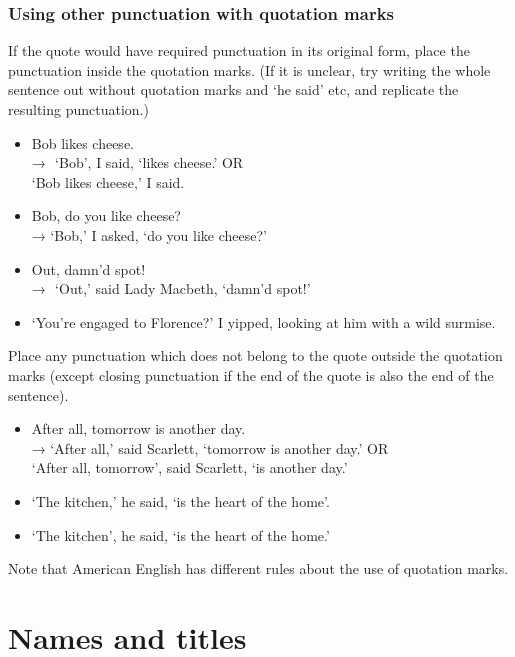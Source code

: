 \documentclass[11pt,a4paper]{book}
\newcommand{\xmark}{{\color{cadmiumred}\ding{54}}}%
\newcommand{\cmark}{{\color{green(html/cssgreen)}\checkmark}}%
\begin{document}
	\subsection{Using other punctuation with quotation marks}
	If the quote would have required punctuation in its original form, place the punctuation inside the quotation marks. (If it is unclear, try writing the whole sentence out without quotation marks and `he said' etc, and replicate the resulting punctuation.)
		{\firasans \begin{mdframed}[backgroundcolor=aliceblue] \begin{itemize}[label=\cmark]
			\item Bob likes cheese.\\ →  `Bob', I said, `likes cheese.' OR\\
			`Bob likes cheese,' I said.
			\item Bob, do you like cheese?\\ → `Bob,' I asked, `do you like cheese?'
			\item Out, damn'd spot!\\ →  `Out,' said Lady Macbeth, `damn'd spot!'
			\item `You're engaged to Florence?' I yipped, looking at him with a wild surmise.
		\end{itemize} \end{mdframed} }
	\newpage
	Place any punctuation which does not belong to the quote outside the quotation marks (except closing punctuation if the end of the quote is also the end of the sentence).
		{\firasans \begin{mdframed}[backgroundcolor=aliceblue] \begin{itemize}[label=\cmark]
			\item After all, tomorrow is another day.\\
			 → `After all,' said Scarlett, `tomorrow is another day.' OR \\
			 `After all, tomorrow', said Scarlett, `is another day.'
			\item[\xmark] `The kitchen,' he said, `is the heart of the home'.
			\item `The kitchen', he said, `is the heart of the home.'
		\end{itemize} \end{mdframed} }
	Note that American English has different rules about the use of quotation marks.
	
	\chapter{Names and titles}
\end{document}
